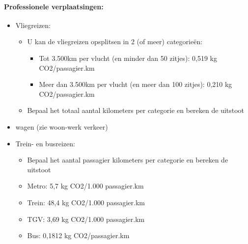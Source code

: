 \documentclass[12pt]{article}
\begin{document}
\paragraph{Professionele verplaatsingen:}
\begin{itemize}
    \item Vliegreizen:\begin{itemize}
        \item U kan de vliegreizen opsplitsen in 2 (of meer) categorieën:\begin{itemize}
            \item Tot 3.500km per vlucht (en minder dan 50 zitjes): 0,519 kg CO2/passagier.km 
            \item Meer dan 3.500km per vlucht (en meer dan 100 zitjes): 0,210 kg
            CO2/passagier.km
        \end{itemize}
        \item Bepaal het totaal aantal kilometers per categorie en bereken de uitstoot
    \end{itemize}
    \item wagen (zie woon-werk verkeer) 
    \item Trein- en busreizen:\begin{itemize}
        \item Bepaal het aantal passagier kilometers per categorie en bereken de uitstoot 
        \item Metro: 5,7 kg CO2/1.000 passagier.km
        \item Trein: 48,4 kg CO2/1.000 passagier.km
        \item TGV: 3,69 kg CO2/1.000 passagier.km
        \item Bus: 0,1812 kg CO2/passagier.km
    \end{itemize}
\end{itemize}
\end{document}
